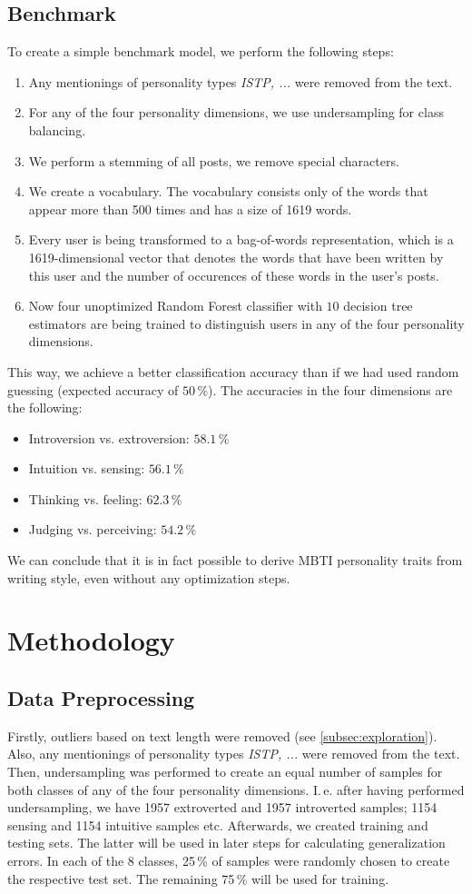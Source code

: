 \documentclass[12pt]{elsarticle}
\begin{document}
\subsection{Benchmark}
To create a simple benchmark model, we perform the following steps:
\begin{enumerate}
\item Any mentionings of personality types \textit{ISTP, ...} were removed from the text.
\item For any of the four personality dimensions, we use undersampling for class balancing.
\item We perform a stemming of all posts, we remove special characters.
\item We create a vocabulary. The vocabulary consists only of the words that appear more than 500 times and has a size of 1619 words.
\item Every user is being transformed to a bag-of-words representation, which is a 1619-dimensional vector that denotes the words that have been written by this user and the number of occurences of these words in the user's posts.
\item Now four unoptimized Random Forest classifier with $10$ decision tree estimators are being trained to distinguish users in any of the four personality dimensions.
\end{enumerate}
This way, we achieve a better classification accuracy than if we had used random guessing (expected accuracy of $50\,\%$). The accuracies in the four dimensions are the following:
\begin{itemize}
\item Introversion vs. extroversion: $58.1\,\%$
\item Intuition vs. sensing:  $56.1\,\%$
\item Thinking vs. feeling:  $62.3\,\%$
\item Judging vs. perceiving:  $54.2\,\%$
\end{itemize}
We can conclude that it is in fact possible to derive MBTI personality traits from writing style, even without any optimization steps. 


\newpage
\section{Methodology}
\subsection{Data Preprocessing}
\label{subsec:preprocessing}
Firstly, outliers based on text length were removed (see \ref{subsec:exploration}). Also, any mentionings of personality types \textit{ISTP, ...} were removed from the text. Then, undersampling was performed to create an equal number of samples for both classes of any of the four personality dimensions. I.\,e. after having performed undersampling, we have 1957 extroverted and 1957 introverted samples; 1154 sensing and 1154 intuitive samples etc. Afterwards, we created training and testing sets. The latter will be used in later steps for calculating generalization errors. In each of the 8 classes, 25\,\% of samples were randomly chosen to create the respective test set. The remaining 75\,\% will be used for training.
\end{document}
